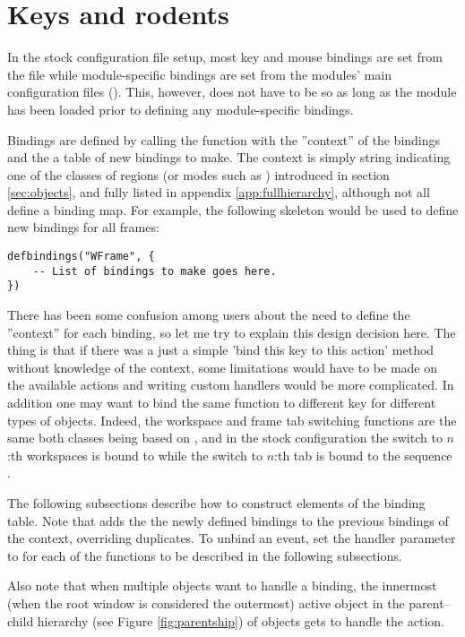 \section{Keys and rodents}
\label{sec:bindings}

In the stock configuration file setup, most key and mouse bindings are set
from the file  while module-specific bindings
are set from the modules' main configuration files ().
This, however, does not have to be so as long as the module has been
loaded prior to defining any module-specific bindings.

Bindings are defined by calling the function 
 with the ''context'' of the
bindings and the a table of new bindings to make. The context is simply
string indicating one of the classes of regions (or modes such as
) introduced in section \ref{sec:objects}, and fully
listed in appendix \ref{app:fullhierarchy}, although not all define
a binding map. For example, the following skeleton would be used to 
define new bindings for all frames:

\begin{verbatim}
defbindings("WFrame", {
    -- List of bindings to make goes here.
})
\end{verbatim}

There has been some confusion among users about the need to define the
''context'' for each binding, so let me try to explain this design
decision here. The thing is that if there was a just a simple 'bind this 
key to this action' method without knowledge of the context, some 
limitations would have to be made on the available actions and writing 
custom handlers would be more complicated. In addition one may want to 
bind the same function to different key for different types of objects.
Indeed, the workspace and frame tab switching functions are the same both
classes being based on , and in the stock configuration the 
switch to $n$:th workspaces is bound to  while the switch to 
$n$:th tab is bound to the sequence .

The following subsections describe how to construct elements of the
binding table. Note that  adds
the the newly defined bindings to the previous bindings of the context,
overriding duplicates. To unbind an event, set the handler parameter
to  for each of the functions to be described in the following
subsections.

Also note that when multiple objects want to handle a binding, the 
innermost (when the root window is considered the outermost) active object
in the parent--child hierarchy (see Figure \ref{fig:parentship}) of objects 
gets to handle the action.


